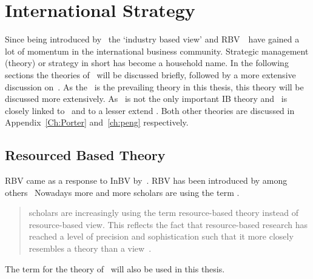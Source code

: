 \section{International Strategy}

Since being introduced by~\citep{Porter:1980to} the `industry based view' and \gls{RBV}~\citep{Barney:1991ur}~have gained a lot of momentum in the international business community.
Strategic management (theory) or strategy in short has become a household name.
In the following sections the theories of~\citep{Barney:1991ur,Barney:2011jp} will be discussed briefly, followed by a more extensive discussion on~\ibv.
As the \rbt~is the prevailing theory in this thesis, this theory will be discussed more extensively.
As \rbt~is not the only important IB theory and \rbt~is closely linked to \inbv~and to a lesser extend \ibv.
Both other theories are discussed in Appendix~\ref{Ch:Porter} and~\ref{ch:peng} respectively.

\subsection{Resourced Based Theory}\label{sec:Barney} %

\Gls{RBV} came as a response to \gls{InBV} by~\cite{Porter:1980to}.
\Gls{RBV} has been introduced by among others~\cite{Barney:1991ur,Wernerfelt:1984hx}
Nowadays more and more scholars are using the term \rbt.
\begin{quote}
  scholars are increasingly using the term resource-based theory instead of
resource-based view.
This reflects the fact that resource-based research has reached a level of
precision and sophistication such that it more closely resembles a theory than a 
view~\citep{Barney:2011jp}.
\end{quote}
The term \rbt for the theory of~\cite{Barney:1991ur,Barney:2011jp} will also be used in this thesis.

